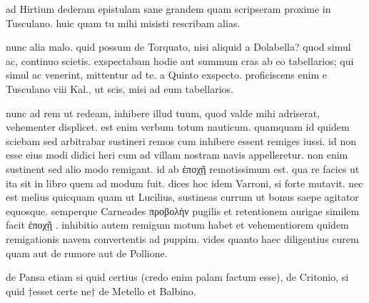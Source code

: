 


 ad Hirtium dederam epistulam sane grandem quam scripseram proxime in Tusculano. huic quam tu mihi misisti rescribam alias.

 nunc alia malo. quid possum de Torquato, nisi aliquid a Dolabella? quod simul ac, continuo scietis. exspectabam hodie aut summum cras ab eo tabellarios; qui simul ac venerint, mittentur ad te. a Quinto exspecto. proficiscens enim e Tusculano viii Kal., ut scis, misi ad eum tabellarios.

 nunc ad rem ut redeam, inhibere illud tuum, quod valde mihi adriserat, vehementer displicet. est enim verbum totum nauticum. quamquam id quidem sciebam sed arbitrabar sustineri remos cum inhibere essent remiges iussi. id non esse eius modi didici heri cum ad villam nostram navis appelleretur. non enim sustinent sed alio modo remigant. id ab ἐποχῇ remotissimum est. qua re facies ut ita sit in libro quem ad modum fuit. dices hoc idem Varroni, si forte mutavit. nec est melius quicquam quam ut Lucilius, sustineas currum ut bonus saepe agitator equosque. semperque Carneades προβολὴν pugilis et retentionem aurigae similem facit ἐποχῇ . inhibitio autem remigum motum habet et vehementiorem quidem remigationis navem convertentis ad puppim. vides quanto haec diligentius curem quam aut de rumore aut de Pollione.

 de Pansa etiam si quid certius (credo enim palam factum esse), de Critonio, si quid †esset certe ne† de Metello et Balbino.
